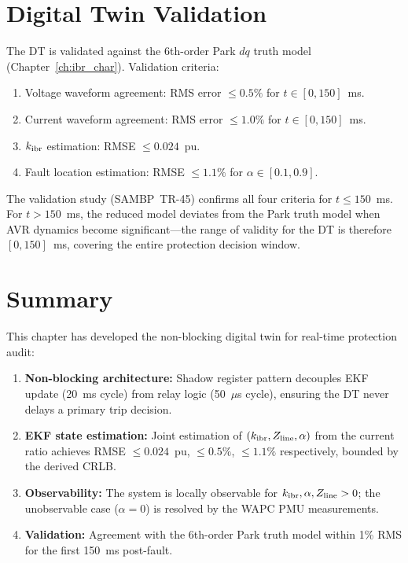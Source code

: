 \section{Digital Twin Validation}
\label{sec:ch9_validation}

The DT is validated against the 6th-order Park $dq$ truth model
(Chapter~\ref{ch:ibr_char}). Validation criteria:
\begin{enumerate}
\item Voltage waveform agreement: RMS error $\leq 0.5\%$ for $t \in [0, 150]$~ms.
\item Current waveform agreement: RMS error $\leq 1.0\%$ for $t \in [0, 150]$~ms.
\item $k_\mathrm{ibr}$ estimation: RMSE $\leq 0.024$~pu.
\item Fault location estimation: RMSE $\leq 1.1\%$ for $\alpha \in [0.1, 0.9]$.
\end{enumerate}

The validation study (SAMBP~TR-45) confirms all four criteria for
$t \leq 150$~ms. For $t > 150$~ms, the reduced model deviates from the
Park truth model when AVR dynamics become significant—the range of
validity for the DT is therefore $[0, 150]$~ms, covering the entire
protection decision window.

\section{Summary}
\label{sec:ch9_summary}

This chapter has developed the non-blocking digital twin for real-time
protection audit:
\begin{enumerate}
\item \textbf{Non-blocking architecture:} Shadow register pattern
      decouples EKF update (20~ms cycle) from relay logic (50~$\mu$s cycle),
      ensuring the DT never delays a primary trip decision.
\item \textbf{EKF state estimation:} Joint estimation of
      $(k_\mathrm{ibr}, Z_\mathrm{line}, \alpha)$ from the current ratio achieves
      RMSE $\leq 0.024$~pu, $\leq 0.5\%$, $\leq 1.1\%$ respectively,
      bounded by the derived CRLB.
\item \textbf{Observability:} The system is locally observable for
      $k_\mathrm{ibr}, \alpha, Z_\mathrm{line} > 0$; the unobservable case
      ($\alpha = 0$) is resolved by the WAPC PMU measurements.
\item \textbf{Validation:} Agreement with the 6th-order Park truth model
      within 1\% RMS for the first 150~ms post-fault.
\end{enumerate}



